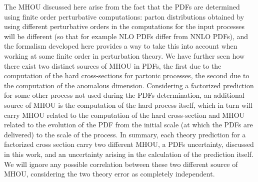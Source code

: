     The MHOU discussed here arise from the fact that the PDFs are determined using finite order
    perturbative computations: parton distributions obtained by using different perturbative orders in the computations
    for the input processes will be different (so that for example NLO PDFs differ from NNLO PDFs), and the formalism
    developed here provides a way to take this into account when working at some finite order in
    perturbation theory. 
    We have further seen how there exist two distinct sources of MHOU in PDFs, the first due to the computation
    of the hard cross-sections for partonic processes, the second due to the computation of the anomalous dimension.
    Considering a factorized prediction for some other process not used during the PDFs determination, 
    an additional source of MHOU is the computation of the hard process itself, which in turn will 
    carry MHOU related to the computation of the hard cross-section and MHOU related to the evolution of the PDF
    from the initial scale (at which the PDFs are delivered) to the scale of the process.
    In summary, each theory prediction for a factorized cross section carry two different MHOU,
    a PDFs uncertainty, discussed in this work, and an uncertainty arising in the calculation of the prediction itself. 
    We will ignore any possible correlation between these two different source of MHOU, 
    considering the two theory error as completely independent.
    
